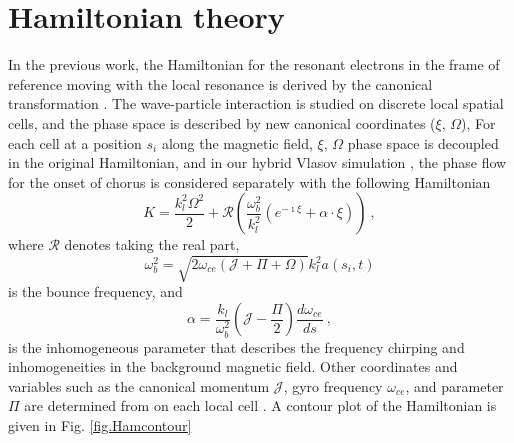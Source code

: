 \section{ Hamiltonian theory}
\label{sec:theory}
In the previous work, the Hamiltonian for the resonant electrons in the frame of reference moving with the local resonance is derived by the canonical transformation \cite{zheng2024}.
The wave-particle interaction is studied on discrete local spatial cells, and the phase space is described by new canonical coordinates ($\xi$, $\Omega$), 
For each cell at a position $s_i$ along the magnetic field, $\xi$, $\Omega$ phase space is decoupled in the original Hamiltonian, and in our hybrid Vlasov simulation \cite{zheng2024,zheng2023b}, the phase flow for the onset of chorus is considered separately with the following Hamiltonian
\begin{equation}\label{eq.H_lab}
    K = \frac{k_l^2\Omega^2}{2} + \mathcal{R}\left(\frac{\omega_b^2}{k_l^2} (e^{-\imath \xi} + \alpha \cdot \xi) \right)~,
\end{equation}
where $\mathcal{R}$ denotes taking the real part, 
\begin{equation}
    \omega_b^2 = \sqrt{2\omega_{ce}(\mathcal{J}+\Pi+\Omega)}k_l^2 a(s_i,t)
\end{equation}
 is the bounce frequency, and 
\begin{equation}\label{eq.alpold}
   \alpha  = \frac{k_l}{\omega_b^2}(\mathcal{J} - \frac{\Pi}{2}) \frac{d\omega_{ce}}{ds}~,
\end{equation}
is the inhomogeneous parameter that describes the frequency chirping and inhomogeneities in the background magnetic field.
Other coordinates and variables such as the canonical momentum $\mathcal{J}$, gyro frequency $\omega_{ce}$, and parameter $\Pi$ are determined from on each local cell \cite{zheng2024,zheng2023b}.
A contour plot of the Hamiltonian is given in Fig. \ref{fig.Hamcontour}
